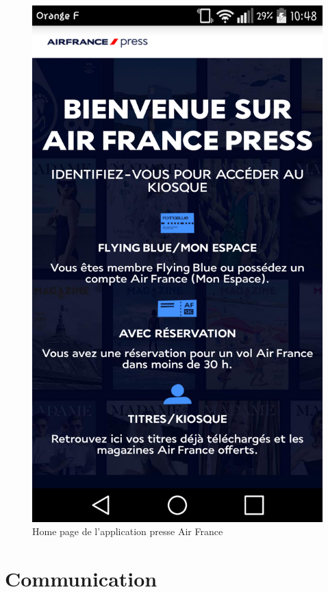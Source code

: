 \documentclass[11pt]{report}
\begin{document}
				\begin{figure}[!htb]
					\center
					\includegraphics[scale = 0.15]{mb1.png}
					\caption{Home page de l'application presse Air France}
				\end{figure}

	\chapter{Communication}
\end{document}
